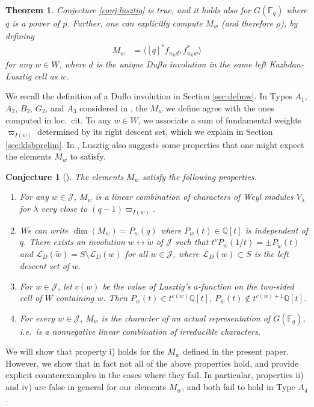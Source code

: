\documentclass{amsart}
\newtheorem{theorem}[thm]{Theorem}
\newtheorem{conjecture}[thm]{Conjecture}
\theoremstyle{definition}
\begin{document}
\begin{theorem}\label{thm:main}
Conjecture \ref{conj:lusztig} is true, and it holds also for $G(\mathbb{F}_q)$ where $q$ is a power of $p$. Further, one can explicitly compute $M_w$ (and therefore $\underline{\rho}$), by defining
\begin{align}
    M_w & = \langle [q]^*f_{w_0d}, f_{w_0w}^*\rangle
\end{align}
for any $w \in W$, where $d$ is the unique Duflo involution in the same left Kazhdan-Lusztig cell as $w$.
\end{theorem}
We recall the definition of a Duflo involution in Section \ref{sec:defmw}. In Types $A_1$, $A_2$, $B_2$, $G_2$, and $A_3$ considered in \cite{L}, the $M_w$ we define agree with the ones computed in loc.\ cit. To any $w \in W$, we associate a sum of fundamental weights $\varpi_{I(w)}$ determined by its right descent set, which we explain in Section \ref{sec:klsbprelim}. In \cite{L}, Lusztig also suggests some properties that one might expect the elements $M_w$ to satisfy.
\begin{conjecture}[\cite{L}]\label{conj:mwprops}
The elements $M_w$ satisfy the following properties.
\begin{enumerate}[label=\roman*)]
    \item For any $w \in \mathcal{J}$, $M_w$ is a linear combination of characters of Weyl modules $V_{\lambda}$ for $\lambda$ very close to $(q-1)\varpi_{I(w)}$.
    \item We can write $\dim(M_w) = P_w(q)$ where $P_w(t) \in \mathbb{Q}[t]$ is independent of $q$. There exists an involution $w \leftrightarrow \tilde{w}$ of $\mathcal{J}$ such that $t^\nu P_w(1/t) = \pm P_{\tilde{w}}(t)$ and $\mathcal{L}_D(\tilde{w}) = S\setminus \mathcal{L}_D(w)$ for all $w \in \mathcal{J}$, where $\mathcal{L}_D(w) \subset S$ is the left descent set of $w$.
    \item For $w \in \mathcal{J}$, let $c(w)$ be the value of Lusztig's $a$-function on the two-sided cell of $W$ containing $w$. Then $P_w(t) \in t^{c(w)}\mathbb{Q}[t]$, $P_w(t) \not\in t^{c(w)+1}\mathbb{Q}[t]$.
    \item For every $w \in \mathcal{J}$, $M_w$ is the character of an actual representation of $G(\mathbb{F}_q)$, i.e.\ is a nonnegative linear combination of irreducible characters.
\end{enumerate}
\end{conjecture}

We will show that property i) holds for the $M_w$ defined in the present paper. However, we show that in fact not all of the above properties hold, and provide explicit counterexamples in the cases where they fail. In particular, properties ii) and iv) are false in general for our elements $M_w$, and both fail to hold in Type $A_4$.
\end{document}
